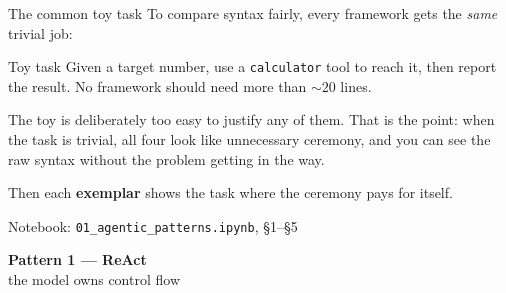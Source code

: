 \documentclass[aspectratio=169,10pt]{beamer}
\newcommand{\code}[1]{\texttt{\small #1}}
\begin{document}
\begin{frame}{The common toy task}
To compare syntax fairly, every framework gets the \emph{same} trivial job:

\vspace{0.8em}
\begin{center}
\begin{minipage}{0.75\textwidth}
\begin{block}{Toy task}
Given a target number, use a \code{calculator} tool to reach it, then report
the result. No framework should need more than ${\sim}20$ lines.
\end{block}
\end{minipage}
\end{center}

\vspace{1em}
The toy is deliberately too easy to justify any of them. That is the point:
when the task is trivial, all four look like unnecessary ceremony, and you
can see the raw syntax without the problem getting in the way.

\vspace{0.8em}
Then each \textbf{exemplar} shows the task where the ceremony pays for itself.

\vfill
\begin{center}\small\color{gray}
Notebook: \code{01\_agentic\_patterns.ipynb}, \S1--\S5
\end{center}
\end{frame}

\begin{frame}[plain]
\begin{center}
{\Large\bfseries Pattern 1 --- ReAct}\\[0.5em]
{\large\color{gray} the model owns control flow}
\end{center}
\end{frame}
\end{document}
